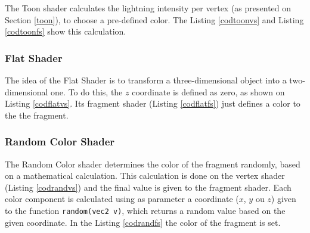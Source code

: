 \documentclass[10pt, conference, compsocconf]{IEEEtran}
\begin{document}
{	The Toon shader calculates the lightning intensity  per vertex (as presented on Section \ref{toon}), to choose a pre-defined color. The Listing \ref{codtoonvs}  and Listing \ref{codtoonfs} show this calculation.

	
  
 	

\subsubsection{Flat Shader}

	The idea of the Flat Shader is to transform a three-dimensional object into a two-dimensional one. To do this, the $z$ coordinate is defined as zero, as shown on Listing \ref{codflatvs}. 
Its fragment shader (Listing \ref{codflatfs}) just defines a color to the the fragment.

	

	

\subsubsection{Random Color Shader}

	The Random Color shader determines the color of the fragment randomly, based on a mathematical calculation. This calculation is done on the vertex shader (Listing \ref{codrandvs}) and the final value is given to the fragment shader. 
Each color component is calculated using as parameter a coordinate ($x$, $y$ ou $z$) given to the function \texttt{random(vec2 v)}, which returns a random value based on the given coordinate. In the Listing \ref{codrandfs} the color of the fragment is set.

	
 
	


}
\end{document}
